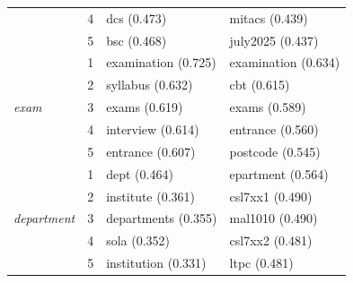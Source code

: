 \documentclass[12pt,a4paper]{article}
\begin{document}
\begin{table}[H]
\begin{tabular}{ll p{4.8cm} p{4.8cm}}
          & 4 & dcs (0.473)      & mitacs (0.439)    \\
          & 5 & bsc (0.468)      & july2025 (0.437)  \\
        \midrule
        \multirow{5}{*}{\textit{exam}}
          & 1 & examination (0.725) & examination (0.634) \\
          & 2 & syllabus (0.632)    & cbt (0.615)         \\
          & 3 & exams (0.619)       & exams (0.589)       \\
          & 4 & interview (0.614)   & entrance (0.560)    \\
          & 5 & entrance (0.607)    & postcode (0.545)    \\
        \midrule
        \multirow{5}{*}{\textit{department}}
          & 1 & dept (0.464)        & epartment (0.564)  \\
          & 2 & institute (0.361)   & csl7xx1 (0.490)    \\
          & 3 & departments (0.355) & mal1010 (0.490)    \\
          & 4 & sola (0.352)        & csl7xx2 (0.481)    \\
          & 5 & institution (0.331) & ltpc (0.481)       \\
        \bottomrule
    \end{tabular}
\end{table}
\end{document}
